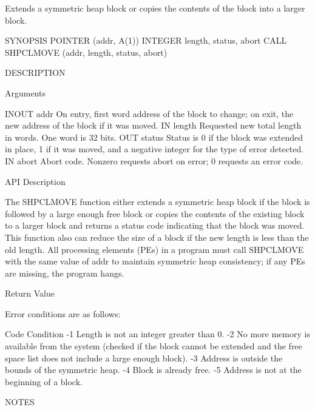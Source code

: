        Extends  a symmetric heap block or copies the contents of
       the block into a larger block.

SYNOPSIS
       POINTER (addr, A(1))
       INTEGER length, status, abort
       CALL SHPCLMOVE (addr, length, status, abort)

DESCRIPTION

Arguments

       INOUT	addr	      On  entry, first word address of the block to change; on
		      exit, the new address of the block if it was moved.
       IN	length	      Requested new total length in words.   One  word
		      is 32 bits.
       OUT	status	      Status  is 0 if the block was extended in place, 1 if it
		      was moved, and a negative integer for the type of	 error
		      detected.
       IN	abort	      Abort code.  Nonzero requests abort on error; 0 requests
		      an error code.

API Description

       The SHPCLMOVE function either extends a symmetric  heap	block  if  the
       block  is  followed by a large enough free block or copies the contents
       of the existing block to a larger  block	 and  returns  a  status  code
       indicating that the block was moved.  This function also can reduce the
       size of a block if the new length is less than  the  old	 length.   All
       processing  elements  (PEs)  in	a program must call SHPCLMOVE with the
       same value of addr to maintain symmetric heap consistency; if  any  PEs
       are missing, the program hangs.

Return Value

       Error conditions are as follows:

       Code	      Condition
       -1	      Length is not an integer greater than 0.
       -2	      No more memory is available from the system (checked  if
		      the  block  cannot  be  extended and the free space list
		      does not include a large enough block).
       -3	      Address is outside the bounds of the symmetric heap.
       -4	      Block is already free.
       -5	      Address is not at the beginning of a block.

NOTES



